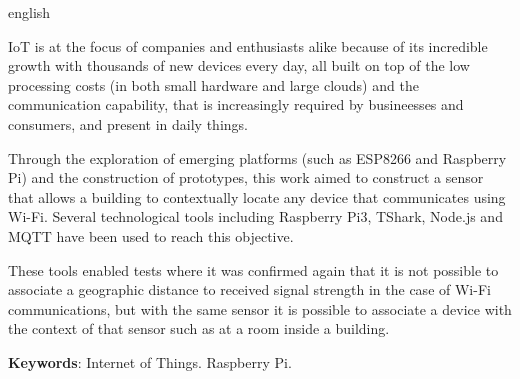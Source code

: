 \begin{resumo}[Abstract]
\begin{otherlanguage*}{english}

		IoT is at the focus of companies and enthusiasts alike because of its incredible
		growth with thousands of new devices every day, all built on top of the low
		processing costs (in both small hardware and large clouds) and the
		communication capability, that is increasingly required by
		busineesses and consumers, and present in daily things.

		Through the exploration of emerging platforms (such as ESP8266 and
		Raspberry Pi) and the construction of prototypes, this work aimed to
		construct a sensor that allows a building to contextually locate any
		device that communicates using Wi-Fi. Several
		technological tools including Raspberry Pi3, TShark, Node.js and MQTT
		have been used to reach this objective.

		These tools enabled tests where it was confirmed again that it is not
		possible to associate a geographic distance to received signal strength
		in the case of Wi-Fi communications, but with the same sensor it
		is possible to associate a device with the context of that sensor such as
		at a room inside a building.

	\textbf{Keywords}: Internet of Things. Raspberry Pi.
\end{otherlanguage*}
\end{resumo}
